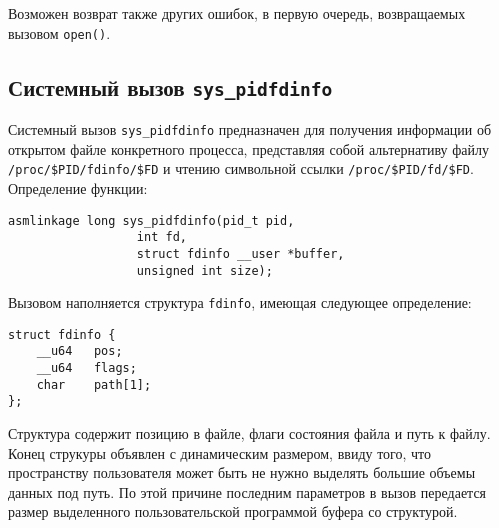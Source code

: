 Возможен возврат также других ошибок, в первую очередь, возвращаемых вызовом
\texttt{open()}.

\subsection{Системный вызов \texttt{sys\_pidfdinfo}}

Системный вызов \texttt{sys\_pidfdinfo} предназначен для получения информации об
открытом файле конкретного процесса, представляя собой
альтернативу файлу \texttt{/proc/\$PID/fdinfo/\$FD} и чтению символьной ссылки 
\texttt{/proc/\$PID/fd/\$FD}. Определение функции:

\medskip
\begin{lstlisting}[style=cstyle]
asmlinkage long sys_pidfdinfo(pid_t pid,
			      int fd,
			      struct fdinfo __user *buffer,
			      unsigned int size);
\end{lstlisting}
\medskip

Вызовом наполняется структура \texttt{fdinfo}, имеющая следующее определение:

\medskip
\begin{lstlisting}[style=cstyle]
struct fdinfo {
	__u64	pos;
	__u64	flags;
	char	path[1];
};
\end{lstlisting}
\medskip

Структура содержит позицию в файле, флаги состояния файла и путь к файлу. Конец
струкуры объявлен с динамическим размером, ввиду того, что пространству
пользователя может быть не нужно выделять большие объемы данных под путь. По
этой причине последним параметров в вызов передается размер выделенного
пользовательской программой буфера со структурой.

